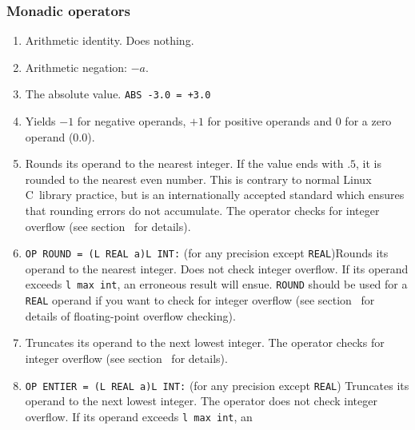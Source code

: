 \subsubsection*{Monadic operators}
\begin{enumerate}
\item {}\newline
Arithmetic identity. Does nothing.
\item {}\newline
Arithmetic negation: $-a$.
\item {}\newline
The absolute value. \verb|ABS -3.0 = +3.0|
\item {} \newline
Yields $-1$ for negative operands, $+1$ for positive op\-erands and $0$ for
a zero operand ($0.0$).
\item {} \newline
Rounds its operand to the nearest integer. If the value ends with $.5$,
it is rounded to the nearest even number. This is contrary to normal
Linux C~library practice, but is an internationally accepted standard
which ensures that rounding errors do not accumulate. The operator
checks for integer overflow (see section~ for details).
\item \verb|OP ROUND = (L REAL a)L INT:|
(for any precision except \verb|REAL|)\newline Rounds its operand to
the nearest integer. Does not check integer overflow. If its operand
exceeds \verb|l max int|, an erroneous result will ensue.
\verb|ROUND| should be used for a \verb|REAL| operand if you want to
check for integer overflow (see section~ for details
of floating-point overflow checking).
\item {}\newline
Truncates its operand to the next lowest integer. The operator checks
for integer overflow (see section~ for details).
\item \verb|OP ENTIER = (L REAL a)L INT:|
(for any precision except \verb|REAL|) \newline
Truncates its operand to the next lowest integer. The operator does not
check integer overflow. If its operand exceeds \verb|l max int|, an

\end{enumerate}
